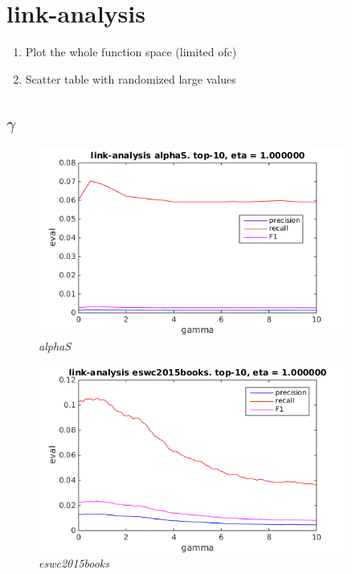 
\section{link-analysis}\label{sec:graphs:link-analysis}

\begin{enumerate}
    \item Plot the whole function space (limited ofc)
    \item Scatter table with randomized large values
\end{enumerate}

\subsection{$\gamma$}

\FloatBarrier

\begin{figure}[h!]
  \centering
    \includegraphics[width=0.9\textwidth]{fig/link_gamma/alphaS_link_gamma.png}
    \caption{\textit{alphaS}}
    \vspace{-10pt}
\end{figure}

\begin{figure}[h!]
  \centering
    \includegraphics[width=0.9\textwidth]{fig/link_gamma/eswc2015books_link_gamma.png}
    \caption{\textit{eswc2015books}}
    \vspace{-10pt}
\end{figure}


